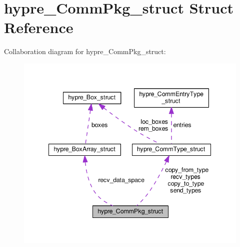 \hypertarget{structhypre__CommPkg__struct}{}\section{hypre\+\_\+\+Comm\+Pkg\+\_\+struct Struct Reference}
\label{structhypre__CommPkg__struct}


Collaboration diagram for hypre\+\_\+\+Comm\+Pkg\+\_\+struct\+:
\nopagebreak
\begin{figure}[H]
\begin{center}
\leavevmode
\includegraphics[width=342pt]{structhypre__CommPkg__struct__coll__graph}
\end{center}
\end{figure}
